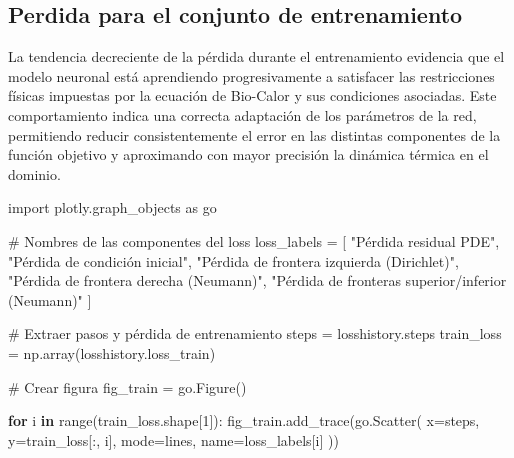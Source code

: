 \documentclass[
  spanish,
  us-letterpaper,
]{scrreprt}
\newenvironment{Shaded}{\begin{snugshade}}{\end{snugshade}}
\newcommand{\BuiltInTok}[1]{\textcolor[rgb]{0.00,0.23,0.31}{#1}}
\newcommand{\CommentTok}[1]{\textcolor[rgb]{0.37,0.37,0.37}{#1}}
\newcommand{\ControlFlowTok}[1]{\textcolor[rgb]{0.00,0.23,0.31}{\textbf{#1}}}
\newcommand{\DecValTok}[1]{\textcolor[rgb]{0.68,0.00,0.00}{#1}}
\newcommand{\ImportTok}[1]{\textcolor[rgb]{0.00,0.46,0.62}{#1}}
\newcommand{\KeywordTok}[1]{\textcolor[rgb]{0.00,0.23,0.31}{\textbf{#1}}}
\newcommand{\NormalTok}[1]{\textcolor[rgb]{0.00,0.23,0.31}{#1}}
\newcommand{\OperatorTok}[1]{\textcolor[rgb]{0.37,0.37,0.37}{#1}}
\newcommand{\StringTok}[1]{\textcolor[rgb]{0.13,0.47,0.30}{#1}}
\theoremstyle{definition}
\theoremstyle{plain}
\theoremstyle{remark}
\begin{document}
\subsection{Perdida para el conjunto de
entrenamiento}\label{perdida-para-el-conjunto-de-entrenamiento}

La tendencia decreciente de la pérdida durante el entrenamiento
evidencia que el modelo neuronal está aprendiendo progresivamente a
satisfacer las restricciones físicas impuestas por la ecuación de
Bio-Calor y sus condiciones asociadas. Este comportamiento indica una
correcta adaptación de los parámetros de la red, permitiendo reducir
consistentemente el error en las distintas componentes de la función
objetivo y aproximando con mayor precisión la dinámica térmica en el
dominio.

\begin{Shaded}
\begin{Highlighting}[]
\ImportTok{import}\NormalTok{ plotly.graph\_objects }\ImportTok{as}\NormalTok{ go}

\CommentTok{\# Nombres de las componentes del loss}
\NormalTok{loss\_labels }\OperatorTok{=}\NormalTok{ [}
    \StringTok{"Pérdida residual PDE"}\NormalTok{,}
    \StringTok{"Pérdida de condición inicial"}\NormalTok{,}
    \StringTok{"Pérdida de frontera izquierda (Dirichlet)"}\NormalTok{,}
    \StringTok{"Pérdida de frontera derecha (Neumann)"}\NormalTok{,}
    \StringTok{"Pérdida de fronteras superior/inferior (Neumann)"}
\NormalTok{]}

\CommentTok{\# Extraer pasos y pérdida de entrenamiento}
\NormalTok{steps }\OperatorTok{=}\NormalTok{ losshistory.steps}
\NormalTok{train\_loss }\OperatorTok{=}\NormalTok{ np.array(losshistory.loss\_train)}

\CommentTok{\# Crear figura}
\NormalTok{fig\_train }\OperatorTok{=}\NormalTok{ go.Figure()}

\ControlFlowTok{for}\NormalTok{ i }\KeywordTok{in} \BuiltInTok{range}\NormalTok{(train\_loss.shape[}\DecValTok{1}\NormalTok{]):}
\NormalTok{    fig\_train.add\_trace(go.Scatter(}
\NormalTok{        x}\OperatorTok{=}\NormalTok{steps,}
\NormalTok{        y}\OperatorTok{=}\NormalTok{train\_loss[:, i],}
\NormalTok{        mode}\OperatorTok{=}\StringTok{\textquotesingle{}lines\textquotesingle{}}\NormalTok{,}
\NormalTok{        name}\OperatorTok{=}\NormalTok{loss\_labels[i]}
\NormalTok{    ))}


\end{Highlighting}
\end{Shaded}
\end{document}

